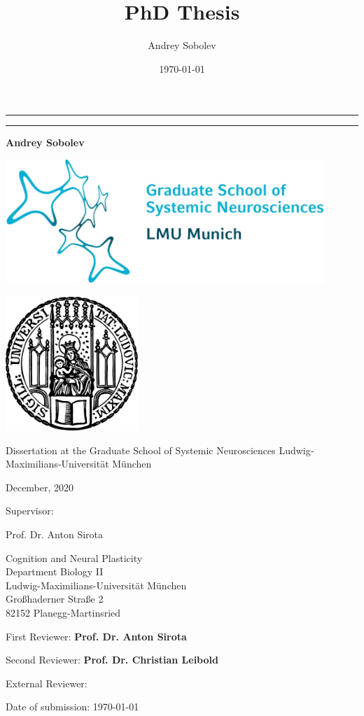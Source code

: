 \documentclass[twoside, 12pt,  footinclude=true, headinclude=true, cleardoublepage=empty]{scrbook}
\title{PhD Thesis}
\author{Andrey Sobolev}
\date{\today}
\begin{document}
\begin{titlepage}
	\centering


    \noindent\rule{15cm}{0.4pt}
    {\linespread{1.5}{\Huge Contribution of the idiothetic and the allothetic information to the hippocampal place code\par}}
    \noindent\rule{15cm}{0.4pt}

	{\LARGE \bfseries Andrey Sobolev}

    \includegraphics[width=120mm]{assets/gsn.jpg}

    \includegraphics[width=50mm]{assets/lmu-logo.png}

    Dissertation at the
    Graduate School of Systemic Neurosciences
    Ludwig‐Maximilians‐Universität München

    December, 2020

    \vfill

	\begin{flushleft}
	{\large Supervisor:}

	{\LARGE Prof. Dr. Anton Sirota\par}
    Cognition and Neural Plasticity\\
    Department Biology II\\
    Ludwig-Maximilians-Universität München\\
    Großhaderner Straße 2\\
    82152 Planegg-Martinsried

	\vspace{1in}

	{\large First Reviewer:   \bfseries Prof. Dr. Anton Sirota\par}
	{\large Second Reviewer:  \bfseries Prof. Dr. Christian Leibold\par}
	{\large External Reviewer:\par}

    \vspace{1in}
	{\large Date of submission: \today\par}
	\end{flushleft}

\end{titlepage}
\end{document}
